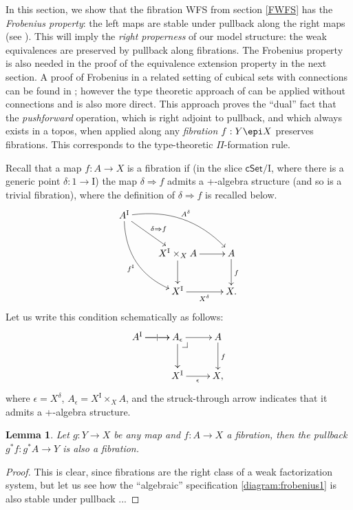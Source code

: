 \documentclass[12pt]{article}
\makeatletter
\newcommand{\cSet}{\ensuremath{\mathsf{cSet}}}
\newcommand{\pbcorner}[1][dr]{\save*!/#1-1.2pc/#1:(-1,1)@^{|-}\restore}
\newcommand{\ra}{\ensuremath{\rightarrow}}
\newcommand{\I}{\ensuremath{\mathrm{I}}}
\newtheorem{lemma}[theorem]{Lemma}
\theoremstyle{remark}
\theoremstyle{definition}
\makeatother
\begin{document}
In this section, we show that the fibration WFS from section \ref{FWFS} has the \emph{Frobenius property}: the left maps are stable under pullback along the right maps (see \cite{vdBG}).  This will imply the \emph{right properness} of our model structure: the weak equivalences are preserved by pullback along fibrations.  The Frobenius property is also needed in the proof of the equivalence extension property in the next section.  A proof of Frobenius in a related setting of cubical sets with connections can be found in \cite{GS}; however the type theoretic approach of \cite{OP,CCHM} can be applied without connections and is also more direct.  This approach proves the ``dual'' fact that the \emph{pushforward} operation, which is right adjoint to pullback, and which always exists in a topos, when applied along any \emph{fibration} $f : Y\epi X$ preserves fibrations.  This corresponds to the type-theoretic $\Pi$-formation rule.  

Recall that a map $f:A\ra X$ is a fibration if (in the slice $\cSet/\I$, where there is a generic point $\delta : 1 \ra \I$) the map $\delta \Rightarrow f$ admits a +-algebra structure (and so is a trivial fibration), where the definition of $\delta \Rightarrow f$ is recalled below.
\begin{equation}\label{diagram:frobenius1}
\xymatrix{
A^\I \ar@/_4ex/ [rdd]_{f^\I} \ar[rd]^{\delta\Rightarrow{f}} \ar@/^4ex/ [rrd]^{A^{\delta}}  && \\
& X^\I \times_{X} A \ar[d] \ar[r] & A \ar[d]^{f} \\
& X^\I \ar[r]_{X^{\delta}} &  X.
}
\end{equation}
Let us write this condition schematically as follows:
\begin{equation}\label{diagram:frobenius1}
\xymatrix{
A^\I \ar[r]|| \ar[r]  & A_\epsilon\ar[d] \pbcorner \ar[r] & A \ar[d]^f \\
& X^\I \ar[r]_{\epsilon} &  X,
}
\end{equation}
where $\epsilon = X^{\delta}$, $A_\epsilon = X^\I \times_{X} A$, and the struck-through arrow indicates that it admits a +-algebra structure.

\begin{lemma}\label{lemma:fibrationspullback}
Let  $g : Y\ra X$ be any map and $f:A \ra X$ a fibration, then the pullback $g^*f : g^*A \ra Y$ is also a fibration.
\end{lemma}
\begin{proof}
This is clear, since fibrations are the right class of a weak factorization system, but let us see how the ``algebraic'' specification \eqref{diagram:frobenius1} is also stable under pullback ...
\end{proof}
\end{document}

